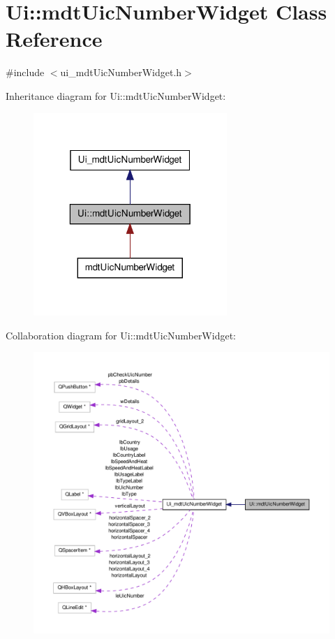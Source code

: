 \hypertarget{class_ui_1_1mdt_uic_number_widget}{\section{Ui\-:\-:mdt\-Uic\-Number\-Widget Class Reference}
\label{class_ui_1_1mdt_uic_number_widget}
}


{\ttfamily \#include $<$ui\-\_\-mdt\-Uic\-Number\-Widget.\-h$>$}



Inheritance diagram for Ui\-:\-:mdt\-Uic\-Number\-Widget\-:\nopagebreak
\begin{figure}[H]
\begin{center}
\leavevmode
\includegraphics[width=208pt]{class_ui_1_1mdt_uic_number_widget__inherit__graph}
\end{center}
\end{figure}


Collaboration diagram for Ui\-:\-:mdt\-Uic\-Number\-Widget\-:\nopagebreak
\begin{figure}[H]
\begin{center}
\leavevmode
\includegraphics[width=350pt]{class_ui_1_1mdt_uic_number_widget__coll__graph}
\end{center}
\end{figure}
